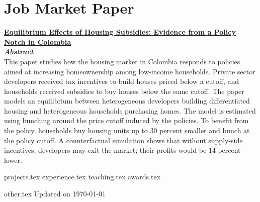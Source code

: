 \documentclass[letterpaper,12pt]{article}
\begin{document}
\section{Job Market Paper}
\href{https://juanpablo-uribe.github.io/Uribe_Brown_JMP_Housing_Subsidies_2021.pdf}{\textbf{Equilibrium Effects of Housing Subsidies: Evidence from a Policy Notch in Colombia}}\\
\textbf{\textit{Abstract}}\\
This paper studies how the housing market in Colombia responds to policies aimed at increasing homeownership among low-income households. Private sector developers received tax incentives to build houses priced below a cutoff, and households received subsidies to buy houses below the same cutoff. The paper models an equilibrium between heterogeneous developers building differentiated housing and heterogeneous households purchasing homes. The model is estimated using bunching around the price cutoff induced by the policies. To benefit from the policy, households buy housing units up to 30 percent smaller and bunch at the policy cutoff. A counterfactual simulation shows that without supply-side incentives, developers may exit the market; their profits would be 14 percent lower.

{projects.tex}
{experience.tex}\newpage
{teaching.tex}
{awards.tex}




%


{other.tex}
\vfill
Updated on \today
\end{document}
